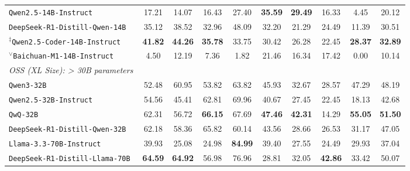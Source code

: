 \begin{table}[t]
{\begin{tabular}{l | c c c | c c | c c | c | c}
\texttt{Qwen2.5-14B-Instruct}~\citep{yang2024qwen2} & 17.21& 14.07& 16.43 &27.40& \textbf{35.59}& \textbf{29.49}& 16.33 & 4.45 &20.12\\
\texttt{DeepSeek-R1-Distill-Qwen-14B}~\citep{guo2025deepseek} & 35.12& 38.52 &32.96& 48.09 &32.20& 21.29& 24.49& 11.39& 30.51\\
$^\ddagger$\texttt{Qwen2.5-Coder-14B-Instruct}~\citep{hui2024qwen2} & \textbf{41.82} & \textbf{44.26} &\textbf{35.78}& 33.75 &30.42 &26.28 &22.45 & \textbf{28.37} &\textbf{32.89}\\
$^\vee$\texttt{Baichuan-M1-14B-Instruct}~\citep{wang2025baichuan} & 4.50& 12.19& 7.36& 1.82 & 21.46 & 16.34 &17.42 & 0.00 & 10.14 \\
\midrule
\multicolumn{10}{l}{\textit{OSS (XL Size): > 30B parameters}}  \\
\midrule
\texttt{Qwen3-32B}~\citep{qwen3} & 52.48& 60.95& 53.82& 63.82 &45.93& 32.67 & 28.57& 47.29& 48.19 \\
\texttt{Qwen2.5-32B-Instruct}~\citep{yang2024qwen2} & 54.56& 45.41& 62.81& 69.96& 40.67& 27.45& 22.45& 18.13& 42.68\\
\texttt{QwQ-32B}~\citep{qwq32b} & 62.31& 56.72& \textbf{66.15} & 67.69& \textbf{47.46}& \textbf{42.31}& 14.29& \textbf{55.05}& \textbf{51.50}\\
\texttt{DeepSeek-R1-Distill-Qwen-32B}~\citep{guo2025deepseek} & 62.18& 58.36& 65.82 &60.14 &43.56 &28.66 & 26.53 &31.17 & 47.05 \\
\texttt{Llama-3.3-70B-Instruct}~\citep{dubey2024llama} &39.93&25.08&24.98&\textbf{84.99}& 39.40& 27.55 & 24.49& 29.93& 37.04\\
\texttt{DeepSeek-R1-Distill-Llama-70B}~\citep{guo2025deepseek} & \textbf{64.59}& \textbf{64.92}& 56.98& 76.96 &28.81 &32.05 & \textbf{42.86} & 33.42 & 50.07\\
\bottomrule
\end{tabular}
}
\label{tab:main_results}
\end{table}
